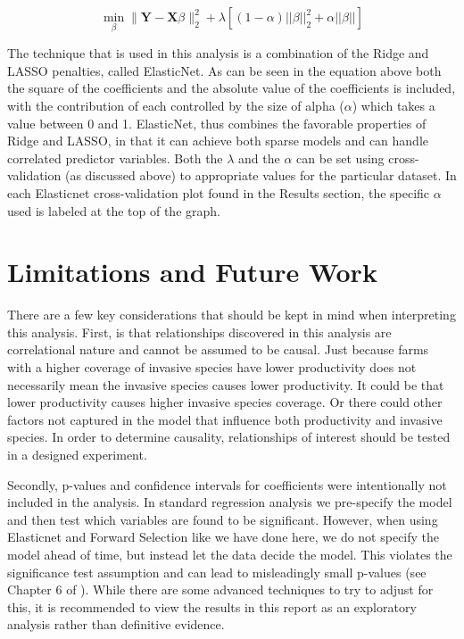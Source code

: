 \documentclass{article}
\newcommand{\bX}{\mathbf{X}}
\newcommand{\bY}{\mathbf{Y}}
\begin{document}
\[\min_{\beta}  \|\bY - \bX\beta\|_{2}^{2} + \lambda[(1 - \alpha)||\beta||_2^2 + \alpha||\beta||] \tag{ElasticNet}\]

The technique that is used in this analysis is a combination of the Ridge and LASSO penalties, called ElasticNet. As can be seen in the equation above both the square of the coefficients and the absolute value of the coefficients is included, with the contribution of each controlled by the size of alpha ($\alpha$) which takes a value between 0 and 1. ElasticNet, thus combines the favorable properties of Ridge and LASSO, in that it can achieve both sparse models and can handle correlated predictor variables. Both the $\lambda$ and the $\alpha$ can be set using cross-validation (as discussed above) to appropriate values for the particular dataset. In each Elasticnet cross-validation plot found in the Results section, the specific $\alpha$ used is labeled at the top of the graph.

\section{Limitations and Future Work}
There are a few key considerations that should be kept in mind when interpreting this analysis. First, is that relationships discovered in this analysis are correlational nature and cannot be assumed to be causal. Just because farms with a higher coverage of invasive species have lower productivity does not necessarily mean the invasive species causes lower productivity. It could be that lower productivity causes higher invasive species coverage. Or there could other factors not captured in the model that influence both productivity and invasive species. In order to determine causality, relationships of interest should be tested in a designed experiment. 

Secondly, p-values and confidence intervals for coefficients were intentionally not included in the analysis. In standard 
regression analysis we pre-specify the model and then test which variables are found to be significant. However, when using 
Elasticnet and Forward Selection like we have done here, we do not specify the model ahead of time, but instead let the data 
decide the model. This violates the significance test assumption and can lead to misleadingly small p-values (see Chapter 6 of \cite{hastie}). While there are some advanced techniques to try to adjust for this, it is recommended to view the results in this report as an exploratory analysis rather than definitive evidence.
\end{document}
